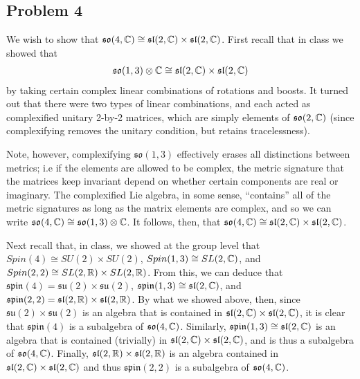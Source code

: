 \documentclass{../mathnotes}
\begin{document}
\subsection*{Problem 4}

We wish to show that $\mathfrak{so}(4,\mathbb{C})\cong \mathfrak{sl}(2,\mathbb{C})\times\mathfrak{sl}(2,\mathbb{C})$. First recall that in class we showed
that
\begin{align*}
    \mathfrak{so}(1,3)\otimes\mathbb{C}\cong \mathfrak{sl}(2,\mathbb{C})\times\mathfrak{sl}(2,\mathbb{C})
\end{align*}
by taking certain complex linear combinations of rotations and boosts. It turned out that there were two types of linear combinations,
and each acted as complexified unitary 2-by-2 matrices, which are simply elements of $\mathfrak{so}(2,\mathbb{C})$ (since complexifying removes
the unitary condition, but retains tracelessness).

Note, however, complexifying $\mathfrak{so}(1,3)$ effectively
erases all distinctions between metrics; i.e if the elements are allowed to be complex, the metric signature that the matrices keep invariant
depend on whether certain components are real or imaginary. The complexified Lie algebra, in some sense, ``contains'' all of the metric
signatures as long as the matrix elements are complex, and so we can write $\mathfrak{so}(4,\mathbb{C})\cong\mathfrak{so}(1,3)\otimes\mathbb{C}$.
It follows, then, that $\mathfrak{so}(4,\mathbb{C})\cong \mathfrak{sl}(2,\mathbb{C})\times\mathfrak{sl}(2,\mathbb{C})$.

Next recall that, in class, we showed at the group level that $Spin(4)\cong SU(2)\times SU(2)$, $Spin(1,3)\cong SL(2,\mathbb{C})$, and
$Spin(2,2)\cong SL(2,\mathbb{R})\times SL(2,\mathbb{R})$. From this, we can deduce that $\mathfrak{spin}(4)=\mathfrak{su}(2)\times\mathfrak{su}(2)$,
$\mathfrak{spin}(1,3)\cong\mathfrak{sl}(2,\mathbb{C})$, and $\mathfrak{spin}(2,2)=\mathfrak{sl}(2,\mathbb{R})\times\mathfrak{sl}(2,\mathbb{R})$. By what we showed
above, then, since $\mathfrak{su}(2)\times\mathfrak{su}(2)$ is an algebra that is contained in $\mathfrak{sl}(2,\mathbb{C})\times \mathfrak{sl}(2,\mathbb{C})$,
it is clear that $\mathfrak{spin}(4)$ is a subalgebra of $\mathfrak{so}(4,\mathbb{C})$. Similarly, $\mathfrak{spin}(1,3)\cong\mathfrak{sl}(2,\mathbb{C})$ is an algebra that is contained
(trivially) in $\mathfrak{sl}(2,\mathbb{C})\times\mathfrak{sl}(2,\mathbb{C})$, and is thus a subalgebra of $\mathfrak{so}(4,\mathbb{C})$. Finally, $\mathfrak{sl}(2,\mathbb{R})\times\mathfrak{sl}(2,\mathbb{R})$
is an algebra contained in $\mathfrak{sl}(2,\mathbb{C})\times\mathfrak{sl}(2,\mathbb{C})$ and thus $\mathfrak{spin}(2,2)$ is a subalgebra of $\mathfrak{so}(4,\mathbb{C})$.
\end{document}
